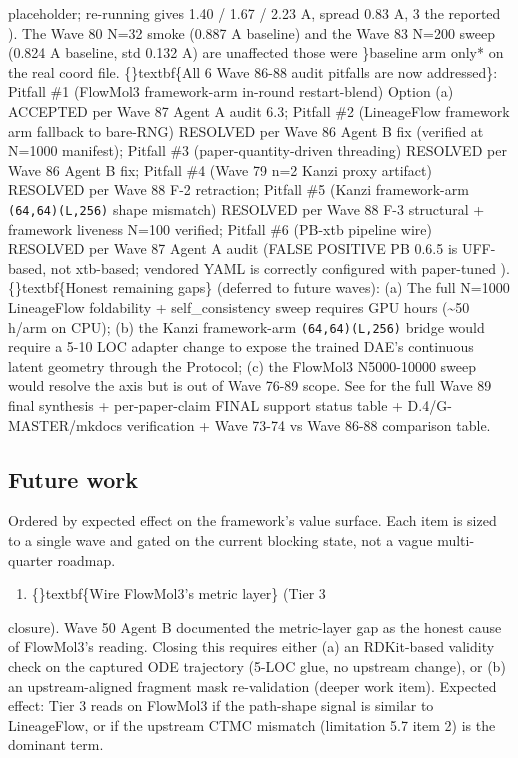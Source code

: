 \documentclass{article}
\begin{document}
placeholder; re-running gives 1.40 / 1.67 / 2.23 A, spread 0.83 A, 3 the reported ). The Wave 80 N=32 smoke (0.887 A baseline) and the Wave 83 N=200 sweep (0.824 A baseline, std 0.132 A) are unaffected  those were \}baseline arm only* on the real  coord file. \{\}textbf\{All 6 Wave 86-88 audit pitfalls are now addressed\}: Pitfall \#1 (FlowMol3 framework-arm in-round restart-blend)  Option (a) ACCEPTED per Wave 87 Agent A audit 6.3; Pitfall \#2 (LineageFlow framework arm fallback to bare-RNG)  RESOLVED per Wave 86 Agent B fix (verified at N=1000 manifest); Pitfall \#3 (paper-quantity-driven  threading)  RESOLVED per Wave 86 Agent B fix; Pitfall \#4 (Wave 79 n=2 Kanzi proxy artifact)  RESOLVED per Wave 88 F-2 retraction; Pitfall \#5 (Kanzi framework-arm \texttt{(64,64)(L,256)} shape mismatch)  RESOLVED per Wave 88 F-3 structural  + framework liveness N=100 verified; Pitfall \#6 (PB-xtb pipeline wire)  RESOLVED per Wave 87 Agent A audit (FALSE POSITIVE  PB 0.6.5  is UFF-based, not xtb-based; vendored YAML is correctly configured with paper-tuned ). \{\}textbf\{Honest remaining gaps\} (deferred to future waves): (a) The full N=1000 LineageFlow foldability + self\_consistency sweep requires GPU hours (\textasciitilde{}50 h/arm on CPU); (b) the Kanzi framework-arm \texttt{(64,64)(L,256)} bridge would require a 5-10 LOC adapter change to expose the trained DAE's continuous latent geometry through the  Protocol; (c) the FlowMol3 N5000-10000 sweep would resolve the  axis but is out of Wave 76-89 scope. See  for the full Wave 89 final synthesis + per-paper-claim FINAL support status table + D.4/G-MASTER/mkdocs verification + Wave 73-74 vs Wave 86-88 comparison table.

\subsection{Future work}
Ordered by expected effect on the framework's value surface. Each item is sized to a single wave and gated on the current blocking state, not a vague multi-quarter roadmap.

\begin{enumerate}
\item \{\}textbf\{Wire FlowMol3's  metric layer\} (Tier 3
\end{enumerate}
closure). Wave 50 Agent B documented the metric-layer gap as the honest cause of FlowMol3's  reading. Closing this requires either (a) an RDKit-based validity check on the captured ODE trajectory (5-LOC glue, no upstream change), or (b) an upstream-aligned fragment mask re-validation (deeper work item). Expected effect: Tier 3 reads  on FlowMol3 if the path-shape signal is similar to LineageFlow, or  if the upstream CTMC mismatch (limitation 5.7 item 2) is the dominant term.
\end{document}
